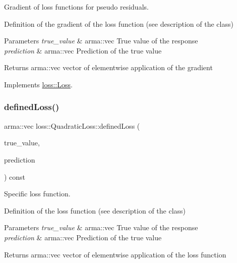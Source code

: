Gradient of loss functions for pseudo residuals. 

Definition of the gradient of the loss function (see description of the class)


\begin{DoxyParams}{Parameters}
{\em true\+\_\+value} & {\ttfamily arma\+::vec} True value of the response \\
\hline
{\em prediction} & {\ttfamily arma\+::vec} Prediction of the true value\\
\hline
\end{DoxyParams}
\begin{DoxyReturn}{Returns}
{\ttfamily arma\+::vec} vector of elementwise application of the gradient 
\end{DoxyReturn}


Implements \mbox{\hyperlink{classloss_1_1_loss_a267a4de70747ade4b2d84ce35a448979}{loss\+::\+Loss}}.

\mbox{\label{classloss_1_1_quadratic_loss_ae34f68243ffe021e309ed73a68796e1e}} 
\subsubsection{\texorpdfstring{defined\+Loss()}{definedLoss()}}
{\footnotesize\ttfamily arma\+::vec loss\+::\+Quadratic\+Loss\+::defined\+Loss (\begin{DoxyParamCaption}\item[{const arma\+::vec \&}]{true\+\_\+value,  }\item[{const arma\+::vec \&}]{prediction }\end{DoxyParamCaption}) const\hspace{0.3cm}{\ttfamily [virtual]}}



Specific loss function. 

Definition of the loss function (see description of the class)


\begin{DoxyParams}{Parameters}
{\em true\+\_\+value} & {\ttfamily arma\+::vec} True value of the response \\
\hline
{\em prediction} & {\ttfamily arma\+::vec} Prediction of the true value\\
\hline
\end{DoxyParams}
\begin{DoxyReturn}{Returns}
{\ttfamily arma\+::vec} vector of elementwise application of the loss function 
\end{DoxyReturn}


